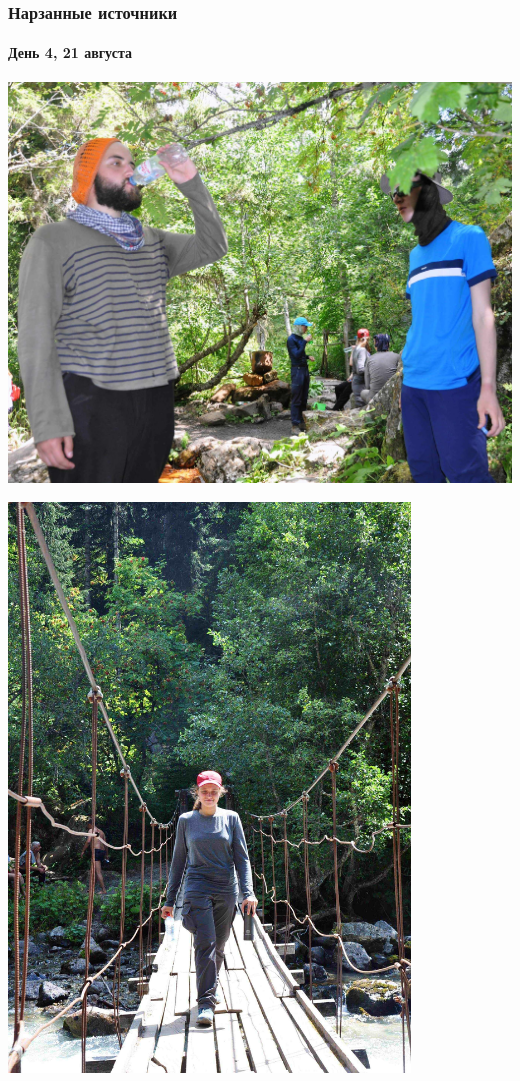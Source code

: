 \begin{frame}
	\frametitle{Нарзанные источники}
	\framesubtitle{День 4, 21 августа}
	{\tiny
		\begin{minipage}{\fourpicsize}
			\centering
			\includegraphics[width=\textwidth]{../pics/DSC_1043}			
		\end{minipage}
		\hfill
		\begin{minipage}{\fourpicsize}
			\centering
			\includegraphics[width=0.8\textwidth]{../pics/DSC_1098}			
		\end{minipage}
		\vfill
	}
\end{frame}

